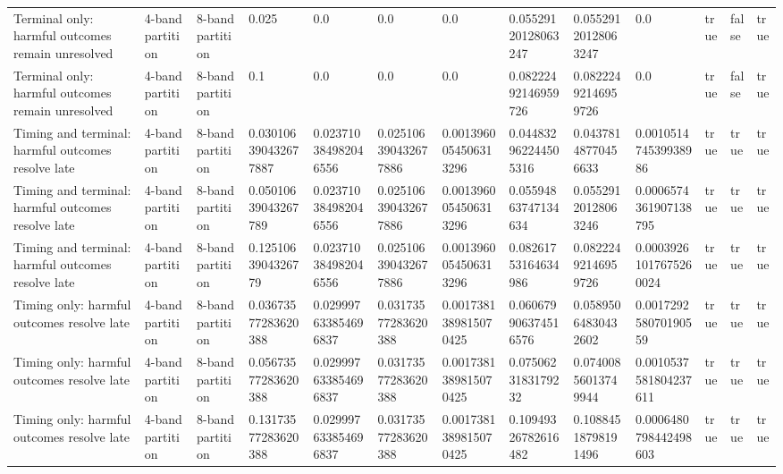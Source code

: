 \begin{tabular}{lllllllllllll}
Terminal only: harmful outcomes remain unresolved & 4-band partition & 8-band partition & 0.025 & 0.0 & 0.0 & 0.0 & 0.05529120128063247 & 0.05529120128063247 & 0.0 & true & false & true \\
Terminal only: harmful outcomes remain unresolved & 4-band partition & 8-band partition & 0.1 & 0.0 & 0.0 & 0.0 & 0.08222492146959726 & 0.08222492146959726 & 0.0 & true & false & true \\
Timing and terminal: harmful outcomes resolve late & 4-band partition & 8-band partition & 0.030106390432677887 & 0.023710384982046556 & 0.025106390432677886 & 0.0013960054506313296 & 0.044832962244505316 & 0.04378148770456633 & 0.001051474539938986 & true & true & true \\
Timing and terminal: harmful outcomes resolve late & 4-band partition & 8-band partition & 0.05010639043267789 & 0.023710384982046556 & 0.025106390432677886 & 0.0013960054506313296 & 0.05594863747134634 & 0.05529120128063246 & 0.0006574361907138795 & true & true & true \\
Timing and terminal: harmful outcomes resolve late & 4-band partition & 8-band partition & 0.1251063904326779 & 0.023710384982046556 & 0.025106390432677886 & 0.0013960054506313296 & 0.08261753164634986 & 0.08222492146959726 & 0.00039261017675260024 & true & true & true \\
Timing only: harmful outcomes resolve late & 4-band partition & 8-band partition & 0.03673577283620388 & 0.029997633854696837 & 0.03173577283620388 & 0.0017381389815070425 & 0.060679906374516576 & 0.05895064830432602 & 0.001729258070190559 & true & true & true \\
Timing only: harmful outcomes resolve late & 4-band partition & 8-band partition & 0.05673577283620388 & 0.029997633854696837 & 0.03173577283620388 & 0.0017381389815070425 & 0.0750623183179232 & 0.07400856013749944 & 0.0010537581804237611 & true & true & true \\
Timing only: harmful outcomes resolve late & 4-band partition & 8-band partition & 0.13173577283620388 & 0.029997633854696837 & 0.03173577283620388 & 0.0017381389815070425 & 0.10949326782616482 & 0.10884518798191496 & 0.0006480798442498603 & true & true & true \\
\bottomrule
\end{tabular}
